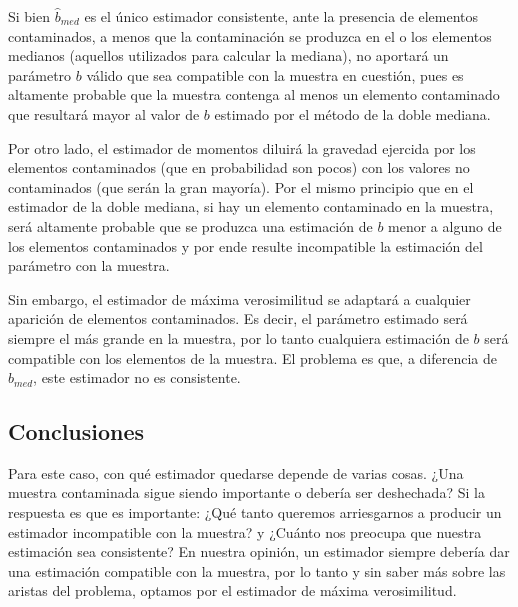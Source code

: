 Si bien $\hat{b}_{med}$ es el único estimador consistente, ante la presencia de elementos contaminados, a menos que la contaminación se produzca en el o los elementos medianos (aquellos utilizados para calcular la mediana), no aportará un parámetro $b$ válido que sea compatible con la muestra en cuestión, pues es altamente probable que la muestra contenga al menos un elemento contaminado que resultará mayor al valor de $b$ estimado por el método de la doble mediana.

\vskip 8pt

Por otro lado, el estimador de momentos diluirá la gravedad ejercida por los elementos contaminados (que en probabilidad son pocos) con los valores no contaminados (que serán la gran mayoría). Por el mismo principio que en el estimador de la doble mediana, si hay un elemento contaminado en la muestra, será altamente probable que se produzca una estimación de $b$ menor a alguno de los elementos contaminados y por ende resulte incompatible la estimación del parámetro con la muestra.

\vskip 8pt

Sin embargo, el estimador de máxima verosimilitud se adaptará a cualquier aparición de elementos contaminados. Es decir, el parámetro estimado será siempre el más grande en la muestra, por lo tanto cualquiera estimación de $b$ será compatible con los elementos de la muestra. El problema es que, a diferencia de $\hat{b}_{med}$, este estimador no es consistente.

\subsection{Conclusiones}

Para este caso, con qué estimador quedarse depende de varias cosas. ¿Una muestra contaminada sigue siendo importante o debería ser deshechada? Si la respuesta es que es importante: ¿Qué tanto queremos arriesgarnos a producir un estimador incompatible con la muestra? y ¿Cuánto nos preocupa que nuestra estimación sea consistente? En nuestra opinión, un estimador siempre debería dar una estimación compatible con la muestra, por lo tanto y sin saber más sobre las aristas del problema, optamos por el estimador de máxima verosimilitud.